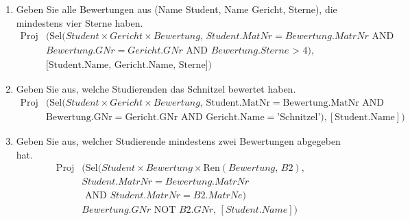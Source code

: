 \begin{enumerate}
    \item Geben Sie alle Bewertungen aus (Name Student, Name Gericht, Sterne), die mindestens vier Sterne haben.
        \begin{align*}
            \text{Proj}&\bigl(
            \text{Sel}(Student \times Gericht \times Bewertung,\, Student.MatNr=Bewertung.MatrNr \text{ AND }\\
            &Bewertung.GNr=Gericht.GNr \text{ AND } Bewertung.Sterne\text{ > } 4),\\
            &\text{[Student.Name, Gericht.Name, Sterne]}
            \bigr)
        \end{align*}

    \item Geben Sie aus, welche Studierenden das Schnitzel bewertet haben.
        \begin{align*}
            \text{Proj}&\bigl(
            \text{Sel}(Student \times Gericht \times Bewertung,\,
            \text{Student.MatNr} = \text{Bewertung.MatNr} \text{ AND }\\
            &\text{Bewertung.GNr} = \text{Gericht.GNr} \text{ AND }
            \text{Gericht.Name} = \text{'Schnitzel'}),
            [\text{Student.Name}]
            \bigr)
            \end{align*}
        
    \item Geben Sie aus, welcher Studierende mindestens zwei Bewertungen abgegeben hat.
        \begin{align*}
            \text{Proj}&\bigl(
            \text{Sel}(Student \times Bewertung \times \text{Ren}(Bewertung,\, B2), \\ 
            &Student.MatrNr=Bewertung.MatrNr\\
            &\text{ AND } Student.MatrNr = B2.MatrNe)\\
            & Bewertung.GNr \text{ NOT } B2.GNr,\, [Student.Name]
            \bigr)
        \end{align*}

\end{enumerate}
